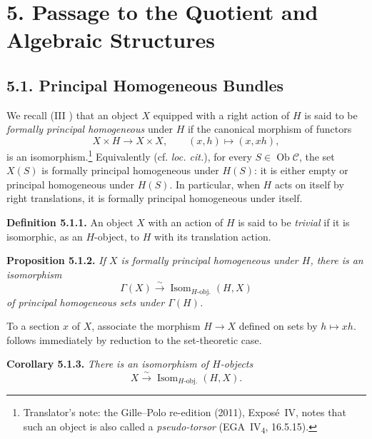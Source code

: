 

\section*{5. Passage to the Quotient and Algebraic Structures}

\subsection*{5.1. Principal Homogeneous Bundles}

%
We recall (III ) that an object \(X\) equipped with a right action of
\(H\) is said to be \emph{formally principal homogeneous} under \(H\) if the canonical morphism of functors
\[
  X\times H\longrightarrow X\times X,
  \qquad (x,h)\longmapsto(x,xh),
\]
is an isomorphism.\footnote{Translator's note: the Gille--Polo re-edition (2011), Expos\'e~IV, notes
that such an object is also called a \emph{pseudo-torsor}
(EGA~IV\textsubscript{4}, 16.5.15).} Equivalently (cf. \emph{loc. cit.}), for every
\(S\in\operatorname{Ob}\mathscr C\), the set \(X(S)\) is formally principal
homogeneous under \(H(S)\): it is either empty or principal homogeneous
under \(H(S)\). In particular, when \(H\) acts on itself by right
translations, it is formally principal homogeneous under itself.

\medskip
\noindent{}\textbf{Definition 5.1.1.}
An object \(X\) with an action of \(H\) is said to be \emph{trivial} if it
is isomorphic, as an \(H\)-object, to \(H\) with its translation action.

\medskip
\noindent{}\textbf{Proposition 5.1.2.}
\textit{If \(X\) is formally principal homogeneous under \(H\), there is an
isomorphism}
\[
  \Gamma(X)\xrightarrow{\sim}
  \operatorname{Isom}_{H\text{-obj.}}(H,X)
\]
\textit{of principal homogeneous sets under \(\Gamma(H)\).}

To a section \(x\) of \(X\), associate the morphism \(H\to X\) defined on
sets by \(h\mapsto xh\).  follows immediately by reduction to
the set-theoretic case.

\medskip
\noindent{}\textbf{Corollary 5.1.3.}
\textit{There is an isomorphism of \(H\)-objects}
\[
  X\xrightarrow{\sim}\operatorname{Isom}_{H\text{-obj.}}(H,X).
\]

